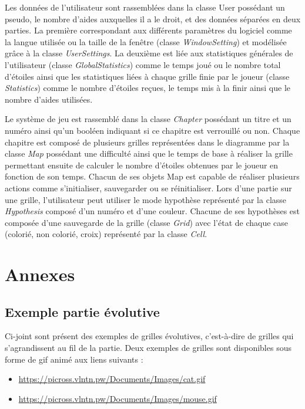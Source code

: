 \documentclass{report}
\begin{document}
	Les données de l’utilisateur sont rassemblées dans la classe User possédant un pseudo, le nombre d’aides auxquelles il a le droit, et des données séparées en deux parties. La première correspondant aux différents paramètres du logiciel comme la langue utilisée ou la taille de la fenêtre (classe \textit{WindowSetting}) et modélisée grâce à la classe \textit{UserSettings}. La deuxième est liée aux statistiques  générales de l’utilisateur (classe \textit{GlobalStatistics}) comme le temps joué ou le nombre total d’étoiles ainsi que les statistiques liées à chaque grille finie par le joueur (classe \textit{Statistics}) comme le nombre d’étoiles reçues, le temps mis à la finir ainsi que le nombre d’aides utilisées.

 	Le système de jeu est rassemblé dans la classe \textit{Chapter} possédant un titre et un numéro ainsi qu’un booléen indiquant si ce chapitre est verrouillé ou non. Chaque chapitre est composé de plusieurs grilles représentées dans le diagramme par la classe \textit{Map} possédant une difficulté ainsi que le temps de base à réaliser la grille permettant ensuite de calculer le nombre d’étoiles obtenues par le joueur en fonction de son temps. Chacun de ses objets Map est capable de réaliser plusieurs actions comme s’initialiser, sauvegarder ou se réinitialiser. Lors d’une partie sur une grille, l’utilisateur peut utiliser le mode hypothèse représenté par la classe \textit{Hypothesis} composé d’un numéro et d’une couleur. Chacune de ses hypothèses est composée d’une sauvegarde de la grille (classe \textit{Grid}) avec l’état de chaque case (colorié, non colorié, croix) représenté par la classe \textit{Cell}.


\chapter{Annexes}

		\section{Exemple partie évolutive}
	
		Ci-joint sont présent des exemples de grilles évolutives, c'est-à-dire de grilles qui s'agrandissent au fil de la partie.
		Deux exemples de grilles sont disponibles sous forme de gif animé aux liens suivants :
		 \begin{itemize}
    		 \item \url{https://picross.vlntn.pw/Documents/Images/cat.gif}
   	   	 \item \url{https://picross.vlntn.pw/Documents/Images/mouse.gif}
		 \end{itemize}
		
\end{document}
